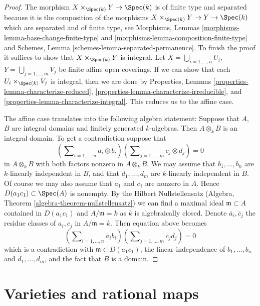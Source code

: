 \begin{proof}
The morphism $X \times_{\Spec(k)} Y \to \Spec(k)$ is of
finite type and separated because it is the composition of the
morphisms $X \times_{\Spec(k)} Y \to Y \to \Spec(k)$
which are separated and of finite type, see
Morphisms, Lemmas \ref{morphisms-lemma-base-change-finite-type} and
\ref{morphisms-lemma-composition-finite-type}
and
Schemes, Lemma \ref{schemes-lemma-separated-permanence}.
To finish the proof it suffices to show that $X \times_{\Spec(k)} Y$
is integral.
Let $X = \bigcup_{i = 1, \ldots, n} U_i$,
$Y = \bigcup_{j = 1, \ldots, m} V_j$ be finite affine open coverings.
If we can show that each $U_i \times_{\Spec(k)} V_j$ is integral,
then we are done by
Properties, Lemmas \ref{properties-lemma-characterize-reduced},
\ref{properties-lemma-characterize-irreducible}, and
\ref{properties-lemma-characterize-integral}.
This reduces us to the affine case.

\medskip\noindent
The affine case translates into the following algebra statement: Suppose
that $A$, $B$ are integral domains and finitely generated $k$-algebras.
Then $A \otimes_k B$ is an integral domain. To get a contradiction suppose that
$$
(\sum\nolimits_{i = 1, \ldots, n} a_i \otimes b_i)
(\sum\nolimits_{j = 1, \ldots, m} c_j \otimes d_j) = 0
$$
in $A \otimes_k B$ with both factors nonzero in $A \otimes_k B$.
We may assume that $b_1, \ldots, b_n$ are $k$-linearly
independent in $B$, and that $d_1, \ldots, d_m$ are $k$-linearly independent
in $B$. Of course we may also assume that $a_1$ and $c_1$ are nonzero
in $A$. Hence $D(a_1c_1) \subset \Spec(A)$ is nonempty. By the
Hilbert Nullstellensatz
(Algebra, Theorem \ref{algebra-theorem-nullstellensatz})
we can find a maximal ideal $\mathfrak m \subset A$ contained in
$D(a_1c_1)$ and $A/\mathfrak m = k$ as $k$ is algebraically closed.
Denote $\overline{a}_i, \overline{c}_j$ the residue classes of
$a_i, c_j$ in $A/\mathfrak m = k$. Then equation above becomes
$$
(\sum\nolimits_{i = 1, \ldots, n} \overline{a}_i b_i)
(\sum\nolimits_{j = 1, \ldots, m} \overline{c}_j d_j) = 0
$$
which is a contradiction with
$\mathfrak m \in D(a_1c_1)$, the linear independence of
$b_1, \ldots, b_n$ and $d_1, \ldots, d_m$, and the fact that $B$ is a domain.
\end{proof}






\section{Varieties and rational maps}
\label{section-varieties-rational-maps}

